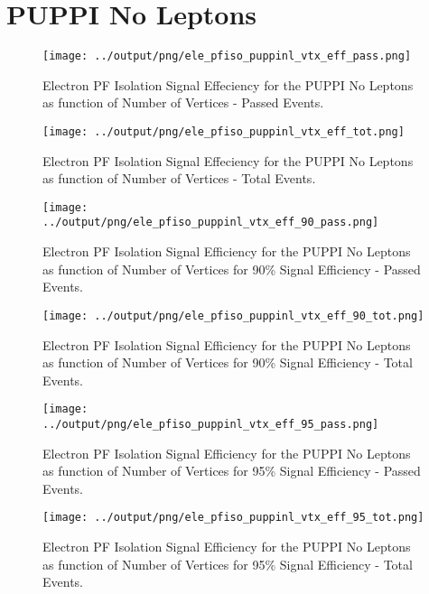 \documentclass[11pt]{book}
\begin{document}
\clearpage

\section{PUPPI No Leptons}
\begin{figure}[htb]
\centering
\texttt{[image: ../output/png/ele\_pfiso\_puppinl\_vtx\_eff\_pass.png]}
\caption{Electron PF Isolation Signal Effeciency for the PUPPI No Leptons as function of Number of Vertices - Passed Events.}
\label{fig:ele_pfiso_vtx_eff_puppinl_pass}
\end{figure}

\begin{figure}[htb]
\centering
\texttt{[image: ../output/png/ele\_pfiso\_puppinl\_vtx\_eff\_tot.png]}
\caption{Electron PF Isolation Signal Effeciency for the PUPPI No Leptons as function of Number of Vertices - Total Events.}
\label{fig:ele_pfiso_vtx_eff_puppinl_tot}
\end{figure}


\begin{figure}[htb]
\centering
\texttt{[image: ../output/png/ele\_pfiso\_puppinl\_vtx\_eff\_90\_pass.png]}
\caption{Electron PF Isolation Signal Efficiency for the PUPPI No Leptons as function of Number of Vertices for 90\% Signal Efficiency - Passed Events.}
\label{fig:ele_pfiso_vtx_eff_puppinl_eff_90_pass}
\end{figure}

\begin{figure}[htb]
\centering
\texttt{[image: ../output/png/ele\_pfiso\_puppinl\_vtx\_eff\_90\_tot.png]}
\caption{Electron PF Isolation Signal Efficiency for the PUPPI No Leptons as function of Number of Vertices for 90\% Signal Efficiency - Total Events.}
\label{fig:ele_pfiso_vtx_eff_puppinl_eff_90_tot}
\end{figure}


\begin{figure}[htb]
\centering
\texttt{[image: ../output/png/ele\_pfiso\_puppinl\_vtx\_eff\_95\_pass.png]}
\caption{Electron PF Isolation Signal Efficiency for the PUPPI No Leptons as function of Number of Vertices for 95\% Signal Efficiency - Passed Events.}
\label{fig:ele_pfiso_vtx_eff_puppinl_eff_95_pass}
\end{figure}

\begin{figure}[htb]
\centering
\texttt{[image: ../output/png/ele\_pfiso\_puppinl\_vtx\_eff\_95\_tot.png]}
\caption{Electron PF Isolation Signal Efficiency for the PUPPI No Leptons as function of Number of Vertices for 95\% Signal Efficiency - Total Events.}
\label{fig:ele_pfiso_vtx_eff_puppinl_eff_95_tot}
\end{figure}
\end{document}
